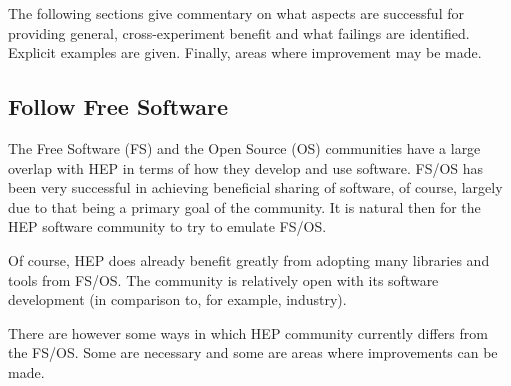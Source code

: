 The following sections give commentary on what aspects are successful
for providing general, cross-experiment benefit and what failings are
identified.  Explicit examples are given.  Finally, areas where
improvement may be made.

\subsection{Follow Free Software}

The Free Software (FS) and the Open Source (OS) communities have a
large overlap with HEP in terms of how they develop and use software.
FS/OS has been very successful in achieving beneficial sharing of
software, of course, largely due to that being a primary goal of the
community.  It is natural then for the HEP software community to try
to emulate FS/OS.

Of course, HEP does already benefit greatly from adopting many
libraries and tools from FS/OS.  The community is relatively open with
its software development (in comparison to, for example, industry).  

There are however some ways in which HEP community currently differs
from the FS/OS.  Some are necessary and some are areas where
improvements can be made.

